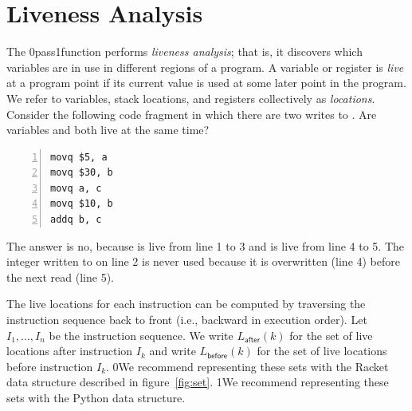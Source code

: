 \documentclass[7x10]{TimesAPriori_MIT}%
\def\racketEd{0}
\def\pythonEd{1}
\providecommand{\BookEdition}{1}
\let\edition\BookEdition
\newcommand{\racket}[1]{{\if\edition\racketEd{#1}\fi}}
\newcommand{\pythonColor}[0]{}
\newcommand{\python}[1]{{\if\edition\pythonEd\pythonColor #1\fi}}
\numberwithin{theorem}{chapter}
\numberwithin{definition}{chapter}
\numberwithin{equation}{chapter}
\begin{document}

\section{Liveness Analysis}
\label{sec:liveness-analysis-Lvar}

The  \racket{pass}\python{function} performs
\emph{liveness analysis}; that is, it discovers which variables are
in use in different regions of a program.
%
A variable or register is \emph{live} at a program point if its
current value is used at some later point in the program.  We refer to
variables, stack locations, and registers collectively as
\emph{locations}.
%
Consider the following code fragment in which there are two writes to
. Are variables  and  both live at the same
time?
\begin{center}
  \begin{minipage}{0.85\textwidth}
\begin{lstlisting}[numbers=left,numberstyle=\tiny]
movq $5, a
movq $30, b
movq a, c
movq $10, b
addq b, c
\end{lstlisting}
\end{minipage}
\end{center}
The answer is no, because  is live from line 1 to 3 and
 is live from line 4 to 5.  The integer written to  on
line 2 is never used because it is overwritten (line 4) before the
next read (line 5).

The live locations for each instruction can be computed by traversing
the instruction sequence back to front (i.e., backward in execution
order).  Let $I_1,\ldots, I_n$ be the instruction sequence. We write
$L_{\mathsf{after}}(k)$ for the set of live locations after
instruction $I_k$ and write $L_{\mathsf{before}}(k)$ for the set of live
locations before instruction $I_k$.  \racket{We recommend representing
  these sets with the Racket  data structure described in
  figure~\ref{fig:set}.}  \python{We recommend representing these sets
  with the Python
  \href{https://docs.python.org/3.10/library/stdtypes.html\#set-types-set-frozenset}{\code{set}}
  data structure.}
\end{document}
